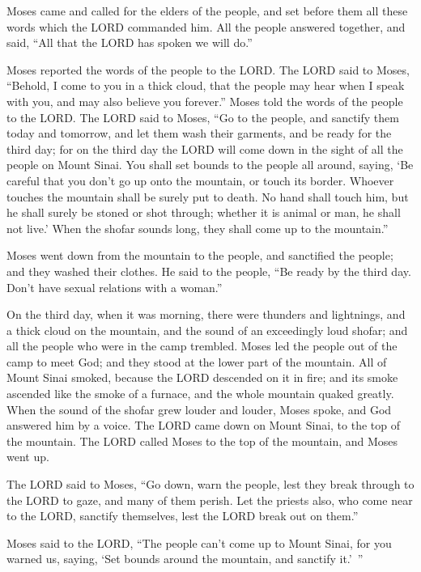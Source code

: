 \myverse{}Moses came and called for the elders of the people, and set before
them all these words which the LORD commanded him.
\myverse{}All the people answered together, and said, “All that the LORD has spoken we
will do.”

Moses reported the words of the people to the LORD. \myverse{}The LORD said to Moses, “Behold, I come to you in a thick cloud, that the people
may hear when I speak with you, and may also believe you forever.” Moses told the words of the people
to the LORD.
\myverse{}The LORD said to Moses, “Go to the people, and sanctify them today and tomorrow,
and let them wash their garments,
\myverse{}and be ready for the third day; for on the third day the LORD will come down
in the sight of all the people on Mount Sinai.
\myverse{}You shall set bounds to the people all around, saying, ‘Be careful that you
don’t go up onto the mountain, or touch its border. Whoever touches the mountain shall be surely put to
death.
\myverse{}No hand shall touch him, but he shall surely be stoned or shot through; whether
it is animal or man, he shall not live.’ When the shofar sounds long, they shall come up to the mountain.”


\myverse{}Moses went down from the mountain to the people, and sanctified
the people; and they washed their clothes.
\myverse{}He said to the people, “Be ready by the third day. Don’t have sexual relations
with a woman.”


\myverse{}On the third day, when it was morning, there were thunders and
lightnings, and a thick cloud on the mountain, and the sound of an exceedingly loud shofar; and all the
people who were in the camp trembled.
\myverse{}Moses led the people out of the camp to meet God; and they stood at the lower
part of the mountain.
\myverse{}All of Mount Sinai smoked, because the LORD descended on it in fire; and
its smoke ascended like the smoke of a furnace, and the whole mountain quaked greatly.
\myverse{}When the sound of the shofar grew louder and louder, Moses spoke, and God
answered him by a voice.
\myverse{}The LORD came down on Mount Sinai, to the top of the mountain. The LORD called
Moses to the top of the mountain, and Moses went up.


\myverse{}The LORD said to Moses, “Go down, warn the people, lest they
break through to the LORD to gaze, and many of them perish.
\myverse{}Let the priests also, who come near to the LORD, sanctify themselves, lest
the LORD break out on them.”


\myverse{}Moses said to the LORD, “The people can’t come up to Mount Sinai,
for you warned us, saying, ‘Set bounds around the mountain, and sanctify it.’ ”


